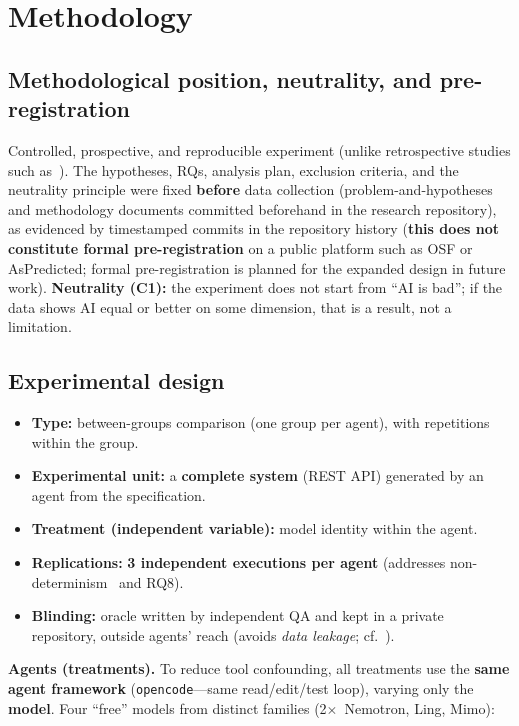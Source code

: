 \documentclass[11pt]{article}
\begin{document}
\section{Methodology}\label{sec:method}

\subsection{Methodological position, neutrality, and pre-registration}

Controlled, prospective, and reproducible experiment (unlike retrospective studies such as~\cite{D05,F04,F05}). The hypotheses, RQs, analysis plan, exclusion criteria, and the neutrality principle were fixed \textbf{before} data collection (problem-and-hypotheses and methodology documents committed beforehand in the research repository), as evidenced by timestamped commits in the repository history (\textbf{this does not constitute formal pre-registration} on a public platform such as OSF or AsPredicted; formal pre-registration is planned for the expanded design in future work). \textbf{Neutrality (C1):} the experiment does not start from ``AI is bad''; if the data shows AI equal or better on some dimension, that is a result, not a limitation.

\subsection{Experimental design}

\begin{itemize}
  \item \textbf{Type:} between-groups comparison (one group per agent), with repetitions within the group.
  \item \textbf{Experimental unit:} a \textbf{complete system} (REST API) generated by an agent from the specification.
  \item \textbf{Treatment (independent variable):} model identity within the agent.
  \item \textbf{Replications:} \textbf{3 independent executions per agent} (addresses non-determinism~\cite{B04} and RQ8).
  \item \textbf{Blinding:} oracle written by independent QA and kept in a private repository, outside agents' reach (avoids \emph{data leakage}; cf.~\cite{C06}).
\end{itemize}

\textbf{Agents (treatments).} To reduce tool confounding, all treatments use the \textbf{same agent framework} (\texttt{opencode}---same read/edit/test loop), varying only the \textbf{model}. Four ``free'' models from distinct families (2$\times$~Nemotron, Ling, Mimo):
\end{document}
